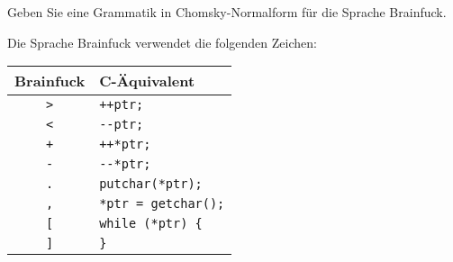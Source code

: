 Geben Sie eine Grammatik in Chomsky-Normalform für die Sprache Brainfuck.

\begin{hinweis}
Die Sprache Brainfuck verwendet die folgenden Zeichen:
\begin{center}
\begin{tabular}{|c|l|}
\hline
Brainfuck&C-Äquivalent\\
\hline
{\tt >}&\verb/++ptr;/\\
{\tt <}&\verb/--ptr;/\\
{\tt +}&\verb/++*ptr;/\\
{\tt -}&\verb/--*ptr;/\\
{\tt .}&\verb/putchar(*ptr);/\\
{\tt ,}&\verb/*ptr = getchar();/\\
{\tt [}&\verb/while (*ptr) {/\\
{\tt ]}&\verb/}/\\
\hline
\end{tabular}
\end{center}
\end{hinweis}



